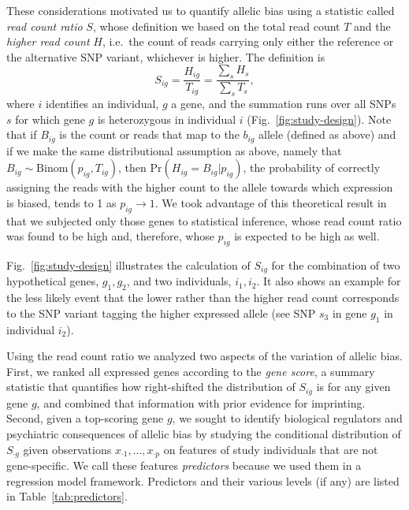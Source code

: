 \documentclass[letterpaper]{article}
\begin{document}
These considerations motivated us to quantify allelic bias using a statistic called
\emph{read count ratio} \(S\), whose definition we
based on the total read count \(T\) and the \emph{higher read count} \(H\),
i.e.~the count of reads carrying only either the reference or the alternative SNP variant,
whichever is higher.  The
definition is
\begin{equation}
S_{ig} = \frac{H_{ig}}{T_{ig}}= \frac{\sum_s H_s}{\sum_sT_s},
\label{eq:S-definition}
\end{equation}
where \(i\) identifies an individual, \(g\) a gene, and the summation runs
over all SNPs \(s\) for which gene \(g\) is heterozygous in individual \(i\) (Fig.~\ref{fig:study-design}).
Note that if \(B_{ig}\) is the count or reads that map to the \(b_{ig}\) allele
(defined as above) and if we make the same distributional assumption as above, namely that \(B_{ig}\sim
\mathrm{Binom}(p_{ig}, T_{ig})\), then \(\mathrm{Pr}(H_{ig}=B_{ig}|p_{ig})\), the probability of correctly
assigning the reads with the higher count to the allele towards which
expression is biased, tends to 1 as \(p_{ig} \rightarrow 1\).  We took
advantage of this theoretical result in that we subjected only those genes to
statistical inference, whose read count ratio was found to be high and,
therefore, whose \(p_{ig}\) is expected to be high as well.

Fig.~\ref{fig:study-design} illustrates the calculation of \(S_{ig}\) for the
combination of two hypothetical genes, \(g_1,g_2\), and two individuals,
\(i_1,i_2\).  It also shows an example for the less likely event that the lower rather
than the higher read count corresponds to the SNP variant tagging the higher
expressed allele (see SNP \(s_3\) in gene \(g_1\) in individual \(i_2\)).

Using the read count ratio we analyzed two aspects of the variation of allelic
bias.  First, we ranked all expressed genes according to the \emph{gene
score}, a summary statistic that quantifies how right-shifted the distribution
of \(S_{ig}\) is for any given gene \(g\), and combined that information with
prior evidence for imprinting.  Second, given a top-scoring gene \(g\), we
sought to identify biological regulators and psychiatric consequences of
allelic bias by studying the conditional distribution of \(S_{\cdot g}\) given
observations \(x_{\cdot 1},...,x_{\cdot p}\) on features of study individuals
that are not gene-specific. We call these features \emph{predictors} because
we used them in a regression model framework.  Predictors and their various
levels (if any) are listed in Table~\ref{tab:predictors}.
\end{document}
